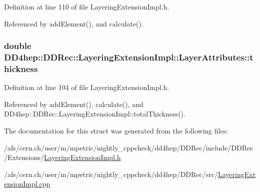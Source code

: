 Definition at line 110 of file LayeringExtensionImpl.h.

Referenced by addElement(), and calculate().\hypertarget{struct_d_d4hep_1_1_d_d_rec_1_1_layering_extension_impl_1_1_layer_attributes_a5c913b79fd8fba9c943fc7b10097663b}{
\subsubsection[{thickness}]{\setlength{\rightskip}{0pt plus 5cm}double {\bf DD4hep::DDRec::LayeringExtensionImpl::LayerAttributes::thickness}}}
\label{struct_d_d4hep_1_1_d_d_rec_1_1_layering_extension_impl_1_1_layer_attributes_a5c913b79fd8fba9c943fc7b10097663b}


Definition at line 104 of file LayeringExtensionImpl.h.

Referenced by addElement(), calculate(), and DD4hep::DDRec::LayeringExtensionImpl::totalThickness().

The documentation for this struct was generated from the following files:\begin{DoxyCompactItemize}
\item 
/afs/cern.ch/user/m/mpetric/nightly\_\-cppcheck/dd4hep/DDRec/include/DDRec/Extensions/\hyperlink{_layering_extension_impl_8h}{LayeringExtensionImpl.h}\item 
/afs/cern.ch/user/m/mpetric/nightly\_\-cppcheck/dd4hep/DDRec/src/\hyperlink{_layering_extension_impl_8cpp}{LayeringExtensionImpl.cpp}\end{DoxyCompactItemize}
